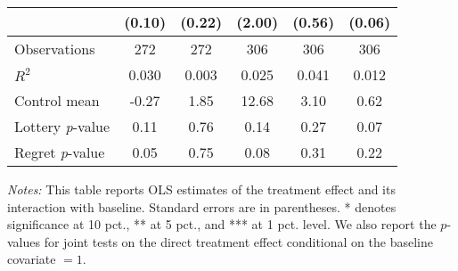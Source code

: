 \begin{table}[htbp]
{\begin{threeparttable}
\begin{tabular}{l*{5}{c}}
                &   (0.10)         &   (0.22)         &   (2.00)         &   (0.56)         &   (0.06)         \\
\midrule
Observations    &      272         &      272         &      306         &      306         &      306         \\
\(R^{2}\)       &    0.030         &    0.003         &    0.025         &    0.041         &    0.012         \\
Control mean    &    -0.27         &     1.85         &    12.68         &     3.10         &     0.62         \\
Lottery \emph{p}-value&     0.11         &     0.76         &     0.14         &     0.27         &     0.07         \\
Regret \emph{p}-value&     0.05         &     0.75         &     0.08         &     0.31         &     0.22         \\
\bottomrule \end{tabular} \begin{tablenotes}[flushleft] \footnotesize \item \emph{Notes:} This table reports OLS estimates of the treatment effect and its interaction with baseline. Standard errors are in parentheses. * denotes significance at 10 pct., ** at 5 pct., and *** at 1 pct. level. We also report the \(p\)-values for joint tests on the direct treatment effect conditional on the baseline covariate $= 1$. \end{tablenotes} \end{threeparttable} } \end{table}
